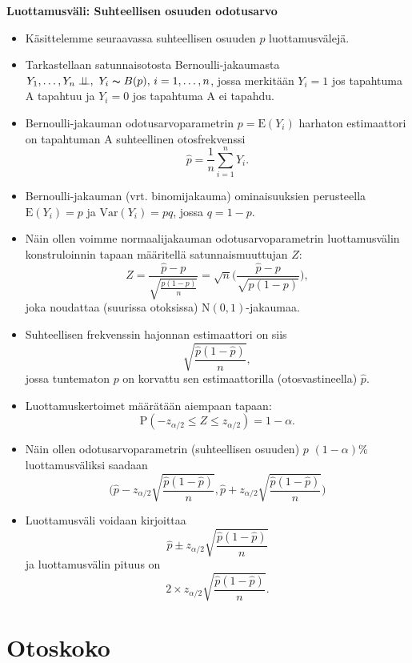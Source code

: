 \documentclass[
]{book}
\begin{document}
\hfill\break

\textbf{Luottamusväli: Suhteellisen osuuden odotusarvo}

\begin{itemize}
\item
  Käsittelemme seuraavassa suhteellisen osuuden \(p\) luottamusvälejä.
\item
  Tarkastellaan satunnaisotosta Bernoulli-jakaumasta
  \(Y_1, \ldots, Y_n \perp \!\!\! \perp, \,\, Y_i \thicksim B(p),\, i=1,\ldots,n\),
  jossa merkitään \(Y_i=1\) jos tapahtuma A tapahtuu ja \(Y_i=0\) jos tapahtuma A ei tapahdu.
\item
  Bernoulli-jakauman odotusarvoparametrin \(p=\text{E}(Y_i)\) harhaton estimaattori on tapahtuman A suhteellinen otosfrekvenssi
  \[
  \widehat{p} = \frac{1}{n} \sum_{i=1}^{n} Y_i.
  \]
\item
  Bernoulli-jakauman (vrt. binomijakauma) ominaisuuksien
  perusteella \(\text{E}(Y_i)=p\) ja \(\mathrm{Var}(Y_i)=pq\), jossa
  \(q=1-p\).
\item
  Näin ollen voimme normaalijakauman odotusarvoparametrin
  luottamusvälin konstruloinnin tapaan määritellä satunnaismuuttujan \(Z\):
  \[
  Z = \frac{\widehat{p} - p}{\sqrt{\frac{p (1-p)}{n}}} = 
  \sqrt{n} \Big(\frac{\widehat{p} - p}{\sqrt{p (1-p)}} \Big),  
  \]
  joka noudattaa (suurissa otoksissa) \(\text{N}(0,1)\)-jakaumaa.
\item
  Suhteellisen frekvenssin hajonnan estimaattori on siis
  \[
  \sqrt{\frac{\widehat{p} (1-\widehat{p})}{n}},
  \]
  jossa tuntematon \(p\) on korvattu sen estimaattorilla (otosvastineella) \(\widehat{p}\).
\item
  Luottamuskertoimet määrätään aiempaan tapaan:
  \[
  \text{P}(-z_{\alpha/2} \le Z \le z_{\alpha/2}) = 1-\alpha.
  \]
\item
  Näin ollen odotusarvoparametrin (suhteellisen osuuden) \(p\) \((1-\alpha)\)\% luottamusväliksi
  saadaan
  \[
  \Big(
  \widehat{p} - z_{\alpha/2} \sqrt{\frac{\widehat{p}(1-\widehat{p})}{n}},
  \widehat{p} + z_{\alpha/2} \sqrt{\frac{\widehat{p}(1-\widehat{p})}{n}} 
  \Big)
  \]
\item
  Luottamusväli voidaan kirjoittaa
  \[
  \widehat{p} \pm z_{\alpha/2} \sqrt{\frac{\widehat{p}(1-\widehat{p})}{n}}
  \]
  ja luottamusvälin pituus on
  \[
  2 \times z_{\alpha/2} \sqrt{\frac{\widehat{p}(1-\widehat{p})}{n}}.
  \]
\end{itemize}

\hypertarget{alaluku92}{%
\section{Otoskoko}\label{alaluku92}}
\end{document}
